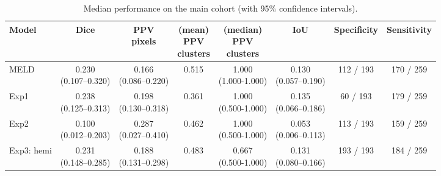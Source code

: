 \documentclass[a4paper,12pt]{article}
\begin{document}
\begin{table}[ht]
\tiny
\centering
\begin{threeparttable}
\caption{Median performance on the main cohort (with 95\% confidence intervals).}
\label{tab:main_cohort}
\begin{tabular}{lccccccc}
\textbf{Model} &
\textbf{Dice} &
\makecell{\textbf{PPV}\\\textbf{pixels}} &
\makecell{\textbf{(mean)} \\\textbf{PPV} \\\textbf{clusters}} & \makecell{\textbf{(median)} \\\textbf{PPV} \\\textbf{clusters}} & 
\textbf{IoU} & 
\textbf{Specificity} &
\textbf{Sensitivity} \\
\midrule
MELD &
\makecell{0.230\\(0.107--0.320)} &
\makecell{0.166\\(0.086--0.220)} &
\colorbox{green!20}{0.515} &
\makecell{1.000 \\ (1.000-1.000)} &
\makecell{0.130\\(0.057--0.190)} &
112 / 193 &
170 / 259 \\

Exp1 &
\makecell{0.238\\(0.125--0.313)} &
\makecell{0.198\\(0.130--0.318)} &
0.361 &
\makecell{1.000 \\ (0.500-1.000)} &
\makecell{0.135\\(0.066--0.186)} &
60 / 193 &
179 / 259 \\

Exp2 &
\makecell{0.100\\\colorbox{red!20}{(0.012--0.203)}} &
\makecell{\colorbox{green!20}{0.287}\\\colorbox{red!20}{(0.027--0.410)}} &
0.462 &
\makecell{1.000 \\ (0.500-1.000)} &
\makecell{0.053\\\colorbox{red!20}{(0.006--0.113)}} &
113 / 193 &
159 / 259 \\

Exp3: hemi &
\makecell{0.231\\(0.148--0.285)} &
\makecell{0.188\\(0.131--0.298)} &
\colorbox{blue!20}{0.483} &
\makecell{0.667 \\ (0.500-1.000)} &
\makecell{0.131\\(0.080--0.166)} &
\colorbox{green!20}{193 / 193} & 
184 / 259 \\


\end{tabular}
\end{threeparttable}
\end{table}
\end{document}
